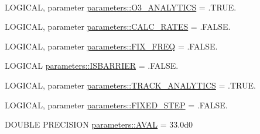 \begin{DoxyCompactItemize}
$$\item 
LOGICAL, parameter \hyperlink{namespaceparameters_aba22684f89f881fe4dc9d78bd30d6f5b}{parameters::O3\_\-ANALYTICS} = .TRUE.
\item 
LOGICAL, parameter \hyperlink{namespaceparameters_abf0f37eb423e843da77558c657a43220}{parameters::CALC\_\-RATES} = .FALSE.
\item 
LOGICAL, parameter \hyperlink{namespaceparameters_a557f350ba21ed1a34656e6cce03635fb}{parameters::FIX\_\-FREQ} = .FALSE.
\item 
LOGICAL \hyperlink{namespaceparameters_a3353739a07b03f983c7528bce590be69}{parameters::ISBARRIER} = .FALSE.
\item 
LOGICAL, parameter \hyperlink{namespaceparameters_ad4575bbb41153e584b501a6238bd4b6c}{parameters::TRACK\_\-ANALYTICS} = .TRUE.
\item 
LOGICAL, parameter \hyperlink{namespaceparameters_a1a34e9253cb6baa25fe90345e4a0ceb2}{parameters::FIXED\_\-STEP} = .FALSE.
\item 
DOUBLE PRECISION \hyperlink{namespaceparameters_ae2d7b8b9e8df09f194ff75d43b02afbb}{parameters::AVAL} = 33.0d0
\end{DoxyCompactItemize}

